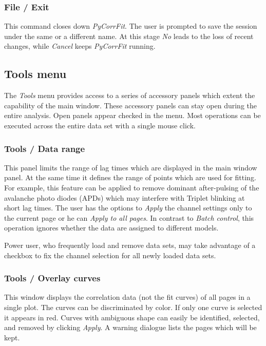 \subsubsection{File / Exit}
\label{sec:menub.filem.exit}
This command closes down \textit{PyCorrFit}. The user is prompted to save the session under the same or a different name. At this stage \textit{No} leads to the loss of recent changes, while \textit{Cancel} keeps \textit{PyCorrFit} running.

\subsection{Tools menu}
\label{sec:menub.tools}
The \textit{Tools} menu provides access to a series of accessory panels which extent the capability of the main window. These accessory panels can stay open during the entire analysis. Open panels appear checked in the menu. Most operations can be executed across the entire data set with a single mouse click. 

\subsubsection{Tools / Data range}
\label{sec:menub.tools.datar}
This panel limits the range of lag times which are displayed in the main window panel. At the same time it defines the range of points which are used for fitting. For example, this feature can be applied to remove dominant after-pulsing of the avalanche photo diodes (APDs) which may interfere with Triplet blinking at short lag times. The user has the options to \textit{Apply} the channel settings only to the current page or he can \textit{Apply to all pages}. In contrast to \textit{Batch control}, this operation ignores whether the data are assigned to different models. 

Power user, who frequently load and remove data sets, may take advantage of a checkbox to fix the channel selection for all newly loaded data sets.

\subsubsection{Tools / Overlay curves}
\label{sec:menub.tools.overl}
This window displays the correlation data (not the fit curves) of all pages in a single plot. The curves can be discriminated by color. If only one curve is selected it appears in red. Curves with ambiguous shape can easily be identified, selected, and removed by clicking \textit{Apply}. A warning dialogue lists the pages which will be kept.

